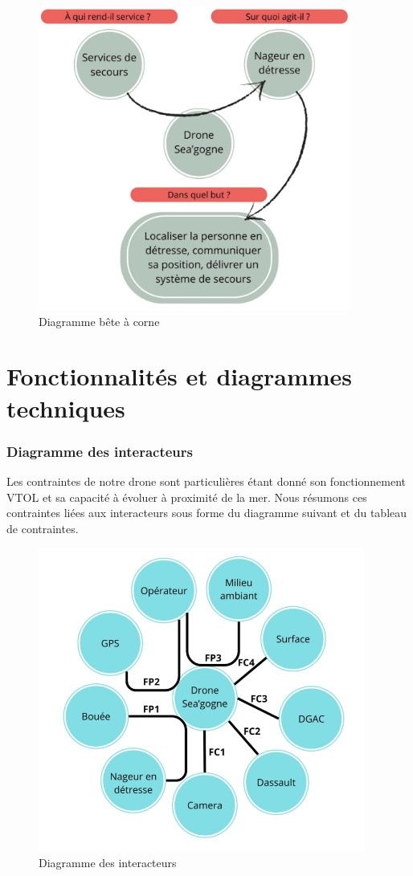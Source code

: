 \documentclass[a4paper,12pt,french]{report}
\begin{document}
\bigskip

\begin{figure}[h]
    \centering
    \includegraphics[height=10cm]{figures/bete.png}
    \caption{Diagramme bête à corne}
    \label{bete}
\end{figure}

\section{Fonctionnalités et diagrammes techniques}

\subsubsection*{Diagramme des interacteurs}

Les contraintes de notre drone sont particulières étant donné son fonctionnement VTOL et sa capacité à évoluer à proximité de la mer. Nous résumons ces contraintes liées aux interacteurs sous forme du diagramme suivant et du tableau de contraintes.

\begin{figure}[h]
    \centering
    \includegraphics[height=10cm]{figures/diagex.png}
    \caption{Diagramme des interacteurs}
    \label{diagex}
\end{figure}
\end{document}
